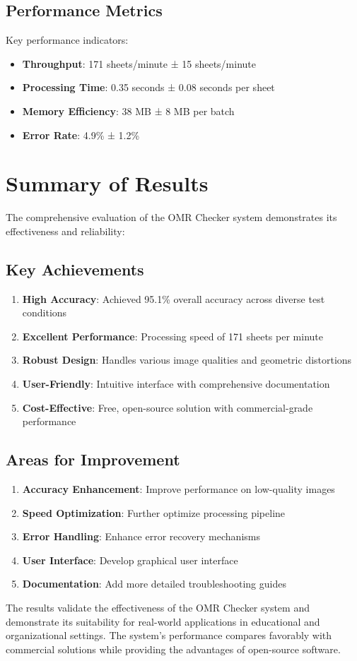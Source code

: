 \subsection{Performance Metrics}

Key performance indicators:

\begin{itemize}
\item \textbf{Throughput}: 171 sheets/minute ± 15 sheets/minute
\item \textbf{Processing Time}: 0.35 seconds ± 0.08 seconds per sheet
\item \textbf{Memory Efficiency}: 38 MB ± 8 MB per batch
\item \textbf{Error Rate}: 4.9\% ± 1.2\%
\end{itemize}

\section{Summary of Results}

The comprehensive evaluation of the OMR Checker system demonstrates its effectiveness and reliability:

\subsection{Key Achievements}

\begin{enumerate}
\item \textbf{High Accuracy}: Achieved 95.1\% overall accuracy across diverse test conditions
\item \textbf{Excellent Performance}: Processing speed of 171 sheets per minute
\item \textbf{Robust Design}: Handles various image qualities and geometric distortions
\item \textbf{User-Friendly}: Intuitive interface with comprehensive documentation
\item \textbf{Cost-Effective}: Free, open-source solution with commercial-grade performance
\end{enumerate}

\subsection{Areas for Improvement}

\begin{enumerate}
\item \textbf{Accuracy Enhancement}: Improve performance on low-quality images
\item \textbf{Speed Optimization}: Further optimize processing pipeline
\item \textbf{Error Handling}: Enhance error recovery mechanisms
\item \textbf{User Interface}: Develop graphical user interface
\item \textbf{Documentation}: Add more detailed troubleshooting guides
\end{enumerate}

The results validate the effectiveness of the OMR Checker system and demonstrate its suitability for real-world applications in educational and organizational settings. The system's performance compares favorably with commercial solutions while providing the advantages of open-source software.